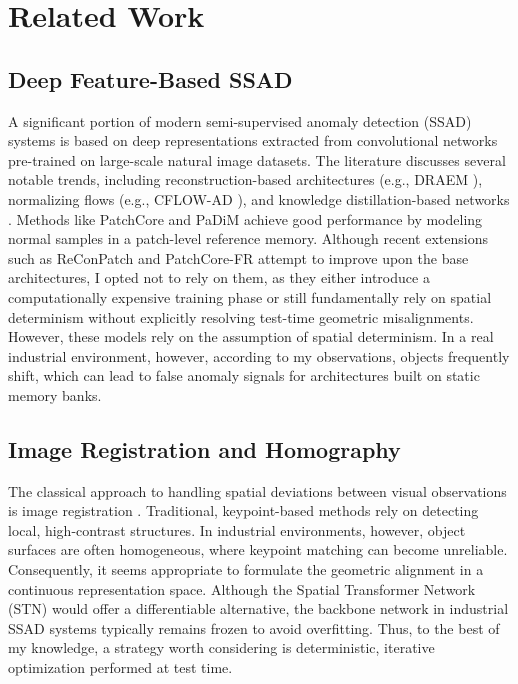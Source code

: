 \documentclass{article}
\begin{document}
	\section{Related Work}\label{sec:related}
	\subsection{Deep Feature-Based SSAD}
	A significant portion of modern semi-supervised anomaly detection (SSAD) systems is based on deep representations extracted from convolutional networks pre-trained on large-scale natural image datasets. The literature discusses several notable trends, including reconstruction-based architectures (e.g., DRAEM \cite{Zavrtanik2021}), normalizing flows (e.g., CFLOW-AD \cite{Gudovskiy2022}), and knowledge distillation-based networks \cite{Deng2022}. Methods like PatchCore \cite{Roth2022} and PaDiM \cite{Defard2021} achieve good performance by modeling normal samples in a patch-level reference memory. Although recent extensions such as ReConPatch \cite{ReConPatch} and PatchCore-FR \cite{FRPatchCore} attempt to improve upon the base architectures, I opted not to rely on them, as they either introduce a computationally expensive training phase or still fundamentally rely on spatial determinism without explicitly resolving test-time geometric misalignments. However, these models rely on the assumption of spatial determinism. In a real industrial environment, however, according to my observations, objects frequently shift, which can lead to false anomaly signals for architectures built on static memory banks.
	
	\subsection{Image Registration and Homography}
	The classical approach to handling spatial deviations between visual observations is image registration \cite{Szeliski2006}. Traditional, keypoint-based methods rely on detecting local, high-contrast structures. In industrial environments, however, object surfaces are often homogeneous, where keypoint matching can become unreliable. Consequently, it seems appropriate to formulate the geometric alignment in a continuous representation space. Although the Spatial Transformer Network (STN) \cite{Jaderberg2015} would offer a differentiable alternative, the backbone network in industrial SSAD systems typically remains frozen to avoid overfitting. Thus, to the best of my knowledge, a strategy worth considering is deterministic, iterative optimization performed at test time.
	
\end{document}
